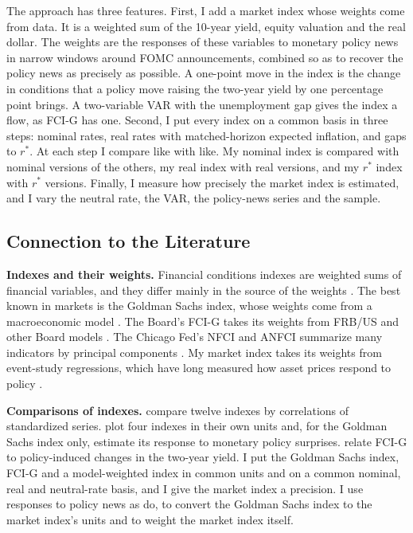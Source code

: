 \documentclass[11pt]{article}
\newcommand{\rs}{r^{*}}
\begin{document}
The approach has three features. First, I add a market index whose weights come from data. It is a weighted sum of the 10-year yield, equity valuation and the real dollar. The weights are the responses of these variables to monetary policy news in narrow windows around FOMC announcements, combined so as to recover the policy news as precisely as possible. A one-point move in the index is the change in conditions that a policy move raising the two-year yield by one percentage point brings. A two-variable VAR with the unemployment gap gives the index a flow, as FCI-G has one. Second, I put every index on a common basis in three steps: nominal rates, real rates with matched-horizon expected inflation, and gaps to $\rs$. At each step I compare like with like. My nominal index is compared with nominal versions of the others, my real index with real versions, and my $\rs$ index with $\rs$ versions. Finally, I measure how precisely the market index is estimated, and I vary the neutral rate, the VAR, the policy-news series and the sample.

\subsection{Connection to the Literature}
\textbf{Indexes and their weights.} Financial conditions indexes are weighted sums of financial variables, and they differ mainly in the source of the weights \citep{hatzius2010}. The best known in markets is the Goldman Sachs index, whose weights come from a macroeconomic model \citep{dudley2000,hatzius2018,hatzius2019}. The Board's FCI-G takes its weights from FRB/US and other Board models \citep{ajello2023}. The Chicago Fed's NFCI and ANFCI summarize many indicators by principal components \citep{brave2011}. My market index takes its weights from event-study regressions, which have long measured how asset prices respond to policy \citep{kuttner2001,gurkaynak2005,bernanke2005,nakamura2018,bauer2023}.

\textbf{Comparisons of indexes.} \citet{aramonte2013} compare twelve indexes by correlations of standardized series. \citet{arnaut2024} plot four indexes in their own units and, for the Goldman Sachs index only, estimate its response to monetary policy surprises. \citet{sack2023} relate FCI-G to policy-induced changes in the two-year yield. I put the Goldman Sachs index, FCI-G and a model-weighted index in common units and on a common nominal, real and neutral-rate basis, and I give the market index a precision. I use responses to policy news as \citet{arnaut2024} do, to convert the Goldman Sachs index to the market index's units and to weight the market index itself.
\end{document}
